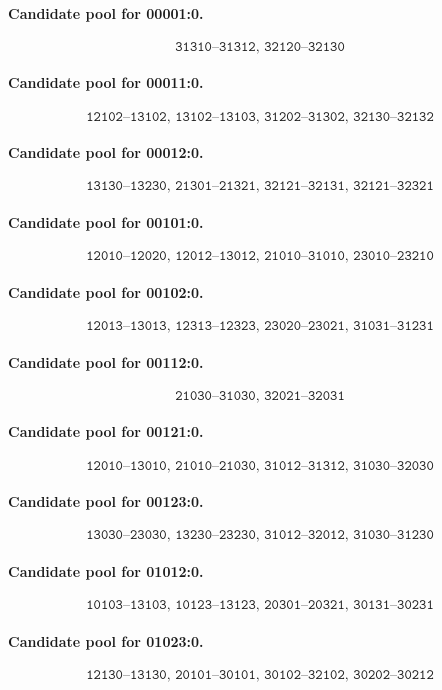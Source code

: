 \paragraph{Candidate pool for 00001:0.}
\[\texttt{31310--31312,\ 32120--32130}\]
\paragraph{Candidate pool for 00011:0.}
\[\texttt{12102--13102,\ 13102--13103,\ 31202--31302,\ 32130--32132}\]
\paragraph{Candidate pool for 00012:0.}
\[\texttt{13130--13230,\ 21301--21321,\ 32121--32131,\ 32121--32321}\]
\paragraph{Candidate pool for 00101:0.}
\[\texttt{12010--12020,\ 12012--13012,\ 21010--31010,\ 23010--23210}\]
\paragraph{Candidate pool for 00102:0.}
\[\texttt{12013--13013,\ 12313--12323,\ 23020--23021,\ 31031--31231}\]
\paragraph{Candidate pool for 00112:0.}
\[\texttt{21030--31030,\ 32021--32031}\]
\paragraph{Candidate pool for 00121:0.}
\[\texttt{12010--13010,\ 21010--21030,\ 31012--31312,\ 31030--32030}\]
\paragraph{Candidate pool for 00123:0.}
\[\texttt{13030--23030,\ 13230--23230,\ 31012--32012,\ 31030--31230}\]
\paragraph{Candidate pool for 01012:0.}
\[\texttt{10103--13103,\ 10123--13123,\ 20301--20321,\ 30131--30231}\]
\paragraph{Candidate pool for 01023:0.}
\[\texttt{12130--13130,\ 20101--30101,\ 30102--32102,\ 30202--30212}\]
